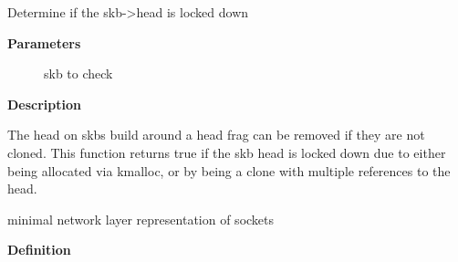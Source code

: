 \documentclass[a4paper,8pt,english]{sphinxmanual}
\begin{document}
\begin{fulllineitems}
\label{networking/kapi:c.skb_head_is_locked}
Determine if the skb-\textgreater{}head is locked down

\end{fulllineitems}


\textbf{Parameters}
\begin{description}
\item[{}] \leavevmode
skb to check

\end{description}

\textbf{Description}

The head on skbs build around a head frag can be removed if they are
not cloned.  This function returns true if the skb head is locked down
due to either being allocated via kmalloc, or by being a clone with
multiple references to the head.

\begin{fulllineitems}
\label{networking/kapi:c.sock_common}
minimal network layer representation of sockets

\end{fulllineitems}


\textbf{Definition}
\end{document}

